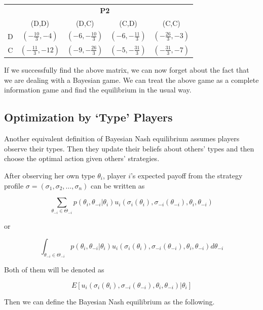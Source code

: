 \documentclass[12pt, oneside]{article}
\begin{document}
\begin{table}[h]
    \centering
    \renewcommand{\arraystretch}{1.5}
    \setlength{\tabcolsep}{12pt}
    \begin{tabular}{c|c|c|c|c}
        \multicolumn{1}{c}{} & \multicolumn{4}{c}{\textbf{P2}} \\
        \multicolumn{1}{c}{} & (D,D) & (D,C) & (C,D) & (C,C) \\
        \hline
        D & \( \left(-\frac{10}{3}, -4 \right) \) & \( (-6, -\frac{10}{3}) \) & \( (-6, -\frac{11}{3}) \) & \( \left(-\frac{26}{3}, -3 \right) \) \\
        C & \( \left(-\frac{11}{3}, -12 \right) \) & \( (-9, -\frac{26}{3}) \) & \( (-5, -\frac{31}{3}) \) & \( \left(-\frac{31}{3}, -7 \right) \) \\
    \end{tabular}
\end{table}

If we successfully find the above matrix, we can now forget about the fact that we are dealing with a
Bayesian game. We can treat the above game as a complete information game and find the equilibrium in the
usual way.

\subsection{Optimization by `Type' Players}
Another equivalent definition of Bayesian Nash equilibrium assumes players observe their types. Then they update their beliefs about others’ types and then choose the optimal action given others’ strategies.

After observing her own type \( \theta_i \), player \( i \)’s expected payoff from the strategy profile \( \sigma = (\sigma_1, \sigma_2, \dots, \sigma_n) \) can be written as

\[
\sum_{\theta_{-i} \in \Theta_{-i}} p(\theta_i, \theta_{-i} | \theta_i) u_i(\sigma_i(\theta_i), \sigma_{-i}(\theta_{-i}), \theta_i, \theta_{-i})
\]

or

\[
\int_{\theta_{-i} \in \Theta_{-i}} p(\theta_i, \theta_{-i} | \theta_i) u_i(\sigma_i(\theta_i), \sigma_{-i}(\theta_{-i}), \theta_i, \theta_{-i}) d\theta_{-i}
\]

Both of them will be denoted as

\[
E[u_i(\sigma_i(\theta_i), \sigma_{-i}(\theta_{-i}), \theta_i, \theta_{-i}) | \theta_i]
\]

Then we can define the Bayesian Nash equilibrium as the following.
\end{document}
